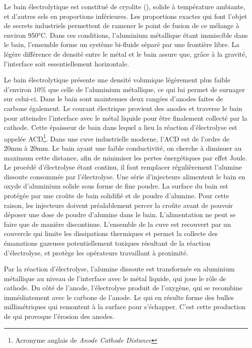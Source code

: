 Le bain électrolytique est constitué de cryolite (),
solide à température ambiante, et d'autres sels en proportions
inférieures. Les proportions exactes qui font l'objet de secrets
industriels permettent de ramener le point de fusion de ce mélange à
environ \num{950}\si{\celsius}. Dans ces conditions, l'aluminium
métallique étant immiscible dans le bain, l'ensemble forme un système
bi-fluide séparé par une frontière libre. La légère différence de
densité entre le métal et le bain assure que, grâce à la gravité,
l'interface soit essentiellement horizontale.

Le bain électrolytique présente une densité volumique légèrement plus
faible d'environ \num{10}\% que celle de l'aluminium métallique, ce
qui lui permet de surnager sur celui-ci. Dans le bain sont maintenues
deux rangées d'anodes faites de carbone également. Le courant
électrique provient des anodes et traverse le bain pour atteindre
l'interface avec le métal liquide pour être finalement collecté par la
cathode. Cette épaisseur de bain dans lequel a lieu la réaction
d'électrolyse est appelée ACD\footnote{Acronyme anglais de \em{Anode
Cathode Distance}}. Dans une cuve industrielle moderne, l'ACD est de
l'ordre de \num{20}\si{\milli\meter} à \num{20}\si{\milli\meter}. Le
bain ayant une faible conductivité, on cherche à diminuer au maximum
cette distance, afin de minimiser les pertes énergétiques par effet
Joule. Le procédé d'électrolyse étant continu, il faut remplacer
régulièrement l'alumine dissoute consommée par l'électrolyse. Une
série d'injecteurs alimentent le bain en oxyde d'aluminium solide sous
forme de fine poudre. La surface du bain est protégée par une croûte
de bain solidifié et de poudre d'alumine. Pour cette raison, les
injecteurs doivent préalablement percer la croûte avant de pouvoir
déposer une dose de poudre d'alumine dans le bain. L'alimentation ne
peut se faire que de manière discontinue. L'ensemble de la cuve est
recouvert par un couvercle qui limite les dissipations thermiques et
permet la collecte des émanations gazeuses potentiellement toxiques
résultant de la réaction d'électrolyse, et protège les opérateurs
travaillant à proximité.

Par la réaction d'électrolyse, l'alumine dissoute est transformée en
aluminium métallique au niveau de l'interface avec le métal liquide,
qui joue le rôle de cathode. Du côté de l'anode, l'électrolyse produit
de l'oxygène, qui se recombine immédiatement avec le carbone de
l'anode. Le  qui en résulte forme des bulles
millimétriques qui remontent à la surface pour s'échapper. C'est cette
production de  qui provoque l'érosion des anodes.


